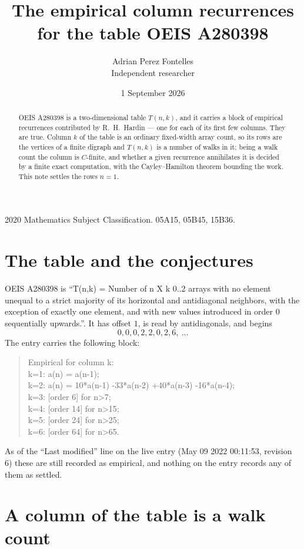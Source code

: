 \documentclass[11pt,a4paper]{article}
\title{The empirical column recurrences for the table OEIS A280398}
\author{Adrian Perez Fontelles\\ \small Independent researcher}
\date{1 September 2026}
\theoremstyle{plain}
\theoremstyle{definition}
\begin{document}
\maketitle

\begin{abstract}
OEIS A280398 is a two-dimensional table $T(n,k)$, and it carries a block of empirical
recurrences contributed by R.~H.~Hardin --- one for each of its first few columns. They are
true. Column $k$ of the table is an ordinary fixed-width array count, so its rows are the
vertices of a finite digraph and $T(n,k)$ is a number of walks in it; being a walk count the
column is $C$-finite, and whether a given recurrence annihilates it is decided by a finite
exact computation, with the Cayley--Hamilton theorem bounding the work. This note settles the rows $n=1$.
\end{abstract}

\noindent\small 2020 Mathematics Subject Classification. 05A15, 05B45, 15B36.\normalsize

\section{The table and the conjectures}

OEIS A280398 is ``T(n,k) = Number of n X k 0..2 arrays with no element unequal to a strict majority of its horizontal and antidiagonal neighbors, with the exception of exactly one element, and with new values introduced in order 0 sequentially upwards.''. It has offset $1$, is
read by antidiagonals, and begins
\[
0, 0, 0, 2, 2, 0, 2, 6,\ \dots
\]
The entry carries the following block:
\begin{quote}\small
Empirical for column k:\\
k=1: a(n) = a(n-1);\\
k=2: a(n) = 10*a(n-1) -33*a(n-2) +40*a(n-3) -16*a(n-4);\\
k=3: [order 6] for n>7;\\
k=4: [order 14] for n>15;\\
k=5: [order 24] for n>25;\\
k=6: [order 64] for n>65.\\
\end{quote}
As of the ``Last modified'' line on the live entry (May 09 2022 00:11:53, revision 6) these are still
recorded as empirical, and nothing on the entry records any of them as settled.

\section{A column of the table is a walk count}
\end{document}

